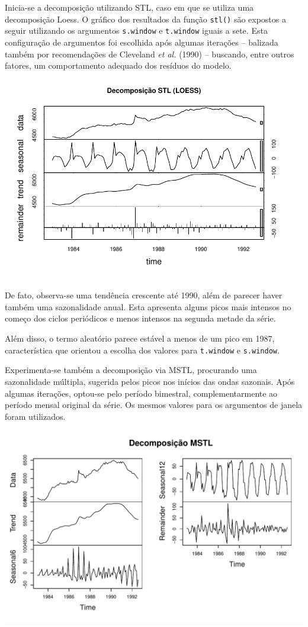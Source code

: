 \documentclass[
  letterpaper,
  DIV=11,
  numbers=noendperiod]{scrartcl}
\begin{document}
Inicia-se a decomposição utilizando STL, caso em que se utiliza uma
decomposição Loess. O gráfico dos resultados da função \texttt{stl()}
são expostos a seguir utilizando os argumentos \texttt{s.window} e
\texttt{t.window} iguais a sete. Esta configuração de argumentos foi
escolhida após algumas iterações -- balizada também por recomendações de
Cleveland \emph{et al.} (1990) -- buscando, entre outros fatores, um
comportamento adequado dos resíduos do modelo.

\includegraphics{T1_grupo15_files/figure-pdf/STL-1.pdf}

De fato, observa-se uma tendência crescente até 1990, além de parecer
haver também uma sazonalidade anual. Esta apresenta alguns picos mais
intensos no começo dos ciclos periódicos e menos intensos na segunda
metade da série.

Além disso, o termo aleatório parece estável a menos de um pico em 1987,
característica que orientou a escolha dos valores para \texttt{t.window}
e \texttt{s.window}.

Experimenta-se também a decomposição via MSTL, procurando uma
sazonalidade múltipla, sugerida pelos picos nos inícios das ondas
sazonais. Após algumas iterações, optou-se pelo período bimestral,
complementarmente ao período mensal original da série. Os mesmos valores
para os argumentos de janela foram utilizados.

\includegraphics{T1_grupo15_files/figure-pdf/unnamed-chunk-1-1.pdf}
\end{document}
